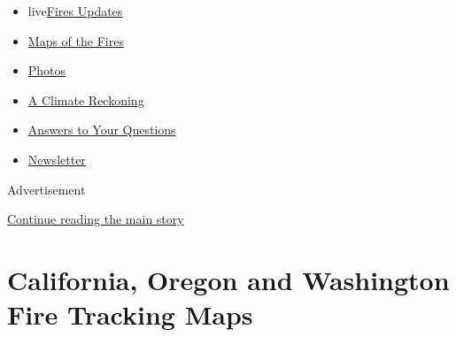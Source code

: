 \begin{itemize}
\tightlist
\item
  live\href{https://www.nytimes3xbfgragh.onion/2020/09/12/us/wildfires-live-updates.html?name=styln-california-wildfires\&region=TOP_BANNER\&block=storyline_menu_recirc\&action=click\&pgtype=Interactive\&impression_id=6cd8b8d1-f52c-11ea-a92a-d1075f6219dd\&variant=undefined}{Fires
  Updates}
\item
  \href{https://www.nytimes3xbfgragh.onion/interactive/2020/us/fires-map-tracker.html?name=styln-california-wildfires\&region=TOP_BANNER\&block=storyline_menu_recirc\&action=click\&pgtype=Interactive\&impression_id=6cd8b8d2-f52c-11ea-a92a-d1075f6219dd\&variant=undefined}{Maps
  of the Fires}
\item
  \href{https://www.nytimes3xbfgragh.onion/article/wildfires-photos-california-oregon-washington-state.html?name=styln-california-wildfires\&region=TOP_BANNER\&block=storyline_menu_recirc\&action=click\&pgtype=Interactive\&impression_id=6cd8b8d3-f52c-11ea-a92a-d1075f6219dd\&variant=undefined}{Photos}
\item
  \href{https://www.nytimes3xbfgragh.onion/2020/09/10/us/climate-change-california-wildfires.html?name=styln-california-wildfires\&region=TOP_BANNER\&block=storyline_menu_recirc\&action=click\&pgtype=Interactive\&impression_id=6cd8b8d4-f52c-11ea-a92a-d1075f6219dd\&variant=undefined}{A
  Climate Reckoning}
\item
  \href{https://www.nytimes3xbfgragh.onion/article/wildfires-california-oregon-washington.html?name=styln-california-wildfires\&region=TOP_BANNER\&block=storyline_menu_recirc\&action=click\&pgtype=Interactive\&impression_id=6cd8b8d5-f52c-11ea-a92a-d1075f6219dd\&variant=undefined}{Answers
  to Your Questions}
\item
  \href{https://www.nytimes3xbfgragh.onion/2020/09/09/us/california-wildfires.html?name=styln-california-wildfires\&region=TOP_BANNER\&block=storyline_menu_recirc\&action=click\&pgtype=Interactive\&impression_id=6cd8dfe0-f52c-11ea-a92a-d1075f6219dd\&variant=undefined}{Newsletter}
\end{itemize}

Advertisement

\protect\hyperlink{after-top}{Continue reading the main story}

\hypertarget{california-oregon-and-washington-fire-tracking-maps}{%
\section{California, Oregon and Washington Fire Tracking
Maps}\label{california-oregon-and-washington-fire-tracking-maps}}

